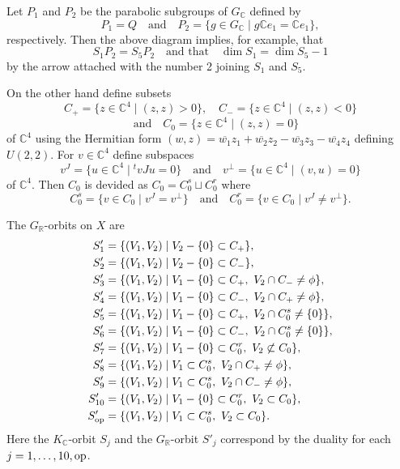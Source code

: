 \documentclass[12pt,a4paper]{amsart}
\theoremstyle{definition}
\theoremstyle{remark}
\numberwithin{equation}{section}
\def\br{\mathbb R}
\def\bc{\mathbb C}
\def\mand{\quad\mbox{and}\quad}
\def\op{{\rm op}}
\begin{document}
Let $P_1$ and $P_2$ be the parabolic subgroups of $G_\bc$ defined by
$$P_1=Q\mand P_2=\{g\in G_\bc\mid g\bc e_1=\bc e_1\},$$
respectively. Then the above diagram implies, for example, that
$$S_1P_2=S_5P_2\quad\mbox{and that}\quad \dim S_1=\dim S_5-1$$
by the arrow attached with the number 2 joining $S_1$ and $S_5$.

On the other hand define subsets
$$C_+=\{z\in\bc^4\mid (z,z)>0\},\quad C_-=\{z\in\bc^4\mid (z,z)<0\}$$
$$\mand C_0=\{z\in\bc^4\mid (z,z)=0\}$$
of $\bc^4$ using the Hermitian form $(w,z)= \overline{w_1}z_1+\overline{w_2}z_2 -\overline{w_3}z_3 -\overline{w_4}z_4$ defining $U(2,2)$. For $v\in \bc^4$ define subspaces
$$v^J=\{u\in \bc^4\mid {}^tvJu=0\}\mand v^\perp=\{u\in \bc^4\mid (v,u)=0\}$$
of $\bc^4$. Then $C_0$ is devided as $C_0=C_0^s\sqcup C_0^r$ where
$$C_0^s=\{v\in C_0\mid v^J=v^\perp\}\mand C_0^r=\{v\in C_0\mid v^J\ne v^\perp\}.$$

The $G_\br$-orbits on $X$ are
\begin{align*}
S'_1 &=\{(V_1,V_2)\mid V_2-\{0\}\subset C_+\}, \\
S'_2 &=\{(V_1,V_2)\mid V_2-\{0\}\subset C_-\}, \\
S'_3 &=\{(V_1,V_2)\mid V_1-\{0\}\subset C_+,\ V_2\cap C_-\ne\phi\}, \\
S'_4 &=\{(V_1,V_2)\mid V_1-\{0\}\subset C_-,\ V_2\cap C_+\ne\phi\}, \\
S'_5 &=\{(V_1,V_2)\mid V_1-\{0\}\subset C_+,\ V_2\cap C_0^s\ne\{0\}\}, \\
S'_6 &=\{(V_1,V_2)\mid V_1-\{0\}\subset C_-,\ V_2\cap C_0^s\ne\{0\}\}, \\
S'_7 &=\{(V_1,V_2)\mid V_1-\{0\}\subset C_0^r,\ V_2\not\subset C_0\}, \\
S'_8 &=\{(V_1,V_2)\mid V_1\subset C_0^s,\ V_2\cap C_+\ne\phi\}, \\
S'_9 &=\{(V_1,V_2)\mid V_1\subset C_0^s,\ V_2\cap C_-\ne\phi\}, \\
S'_{10} &=\{(V_1,V_2)\mid V_1-\{0\}\subset C_0^r,\ V_2\subset C_0\}, \\
S'_\op &=\{(V_1,V_2)\mid V_1\subset C_0^s,\ V_2\subset C_0\}.
\end{align*}
Here the $K_\bc$-orbit $S_j$ and the $G_\br$-orbit $S'_j$ correspond by the duality for each $j=1,\ldots,10,\op$.
\end{document}
